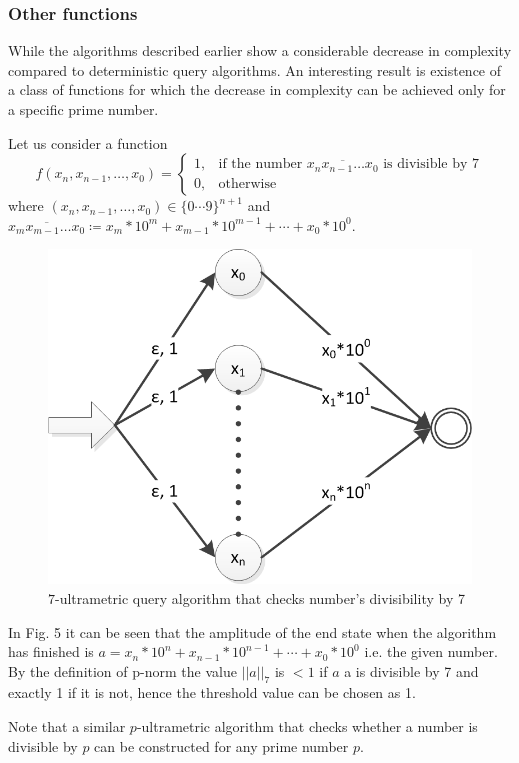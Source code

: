 \documentclass{llncs}
\begin{document}
\subsubsection{Other functions}
While the algorithms described earlier show a considerable decrease in complexity compared to deterministic query algorithms. An interesting result is existence of a class of functions for which the decrease in complexity can be achieved only for a specific prime number.

Let us consider a function
$$
f(x_n,x_{n-1},\dots,x_0)=\begin{cases}
1, & \text{if the number } \overline{x_nx_{n-1}\dots x_0} \text{ is divisible by 7} \\
0, & \text{otherwise}
\end{cases}
$$
where $(x_n,x_{n-1},\dots,x_0) \in \{0 \cdots 9\}^{n+1}$ and $\overline{x_mx_{m-1}\dots x_0} \coloneqq x_m*10^m+x_{m-1}*10^{m-1}+\cdots+x_0*10^0$.
\begin{figure}
	\centering
	\includegraphics{divisibility.png}
	\caption{$7$-ultrametric query algorithm that checks number's divisibility by 7}
	  \label{div}
\end{figure}

In Fig. 5 it can be seen that the amplitude of the end state when the algorithm has finished is $a=x_n*10^n+x_{n-1}*10^{n-1}+\cdots+x_0*10^0$ i.e. the given number. By the definition of p-norm the value $||a||_7$ is $<1$ if $a$ a is divisible by 7 and exactly 1 if it is not, hence the threshold value can be chosen as 1.

Note that a similar $p$-ultrametric algorithm that checks whether a number is divisible by $p$ can be constructed for any prime number $p$.
%




\end{document}
